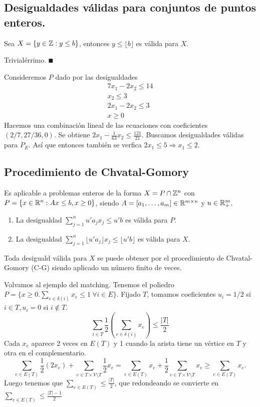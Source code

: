 \documentclass[MIOP.tex]{subfiles}
\begin{document}
\subsection{Desigualdades válidas para conjuntos de puntos enteros.}
\begin{prop}
Sea $X=\{y\in\mathbb{Z}:y\leq b\}$, entonces $y\leq\lfloor b\rfloor$ es válida para $X$.
\end{prop}
\begin{dem}
Trivialérrimo. $\QED$
\end{dem}
\begin{ej}
Consideremos $P$ dado por las desigualdades
\begin{align*}
7x_1-2x_2\leq 14\\
x_2\leq 3\\
2x_1-2x_2\leq 3\\
x\geq 0
\end{align*}
Hacemos una combinación lineal de las ecuaciones con coeficientes $(2/7,27/36, 0)$. Se obtiene $2x_1-\frac{1}{63}x_2\leq\frac{121}{21}$. Buscamos desigualdades válidas para $P_E$. Así que entonces también se verfica $2x_1\leq 5\Rightarrow x_1\leq 2$.
\end{ej}

\subsection{Procedimiento de Chvatal-Gomory}
Es aplicable a problemas enteros de la forma $X=P\cap\mathbb{Z}^n$ con $P=\{x\in\mathbb{R}^n:Ax\leq b,x\geq 0\}$, siendo $A=[a_1,\dots,a_m]\in\mathbb{R}^{m\times n}$ y $u\in\mathbb{R}^m_+$. 
\begin{enumerate}
\item La desigualdad $\sum_{j=1}^nu'a_jx_j\leq u'b$ es válida para $P$.
\item La desigualdad $\sum_{j=1}^n\lfloor u'a_j\rfloor x_j\leq \lfloor u'b\rfloor$ es válida para $X$.
\end{enumerate}
\begin{teorema}
Toda desiguald válida para $X$ se puede obtener por el procedimiento de Chvatal-Gomory (C-G) siendo aplicado un número finito de veces.
\end{teorema}
\begin{ej}
Volvamos al ejemplo del matching. Tenemos el poliedro $P=\{x\geq 0.\sum_{e\in\delta(i)}x_e\leq 1\ \forall i\in E\}$. Fijado $T$, tomamos coeficientes $u_i=1/2$ si $i\in T, u_i=0$ si $i\notin T$. 
$$\sum_{i\in T}\frac{1}{2}(\sum_{e\in\delta(i)}x_e)\leq\frac{|T|}{2}$$
Cada $x_e$ aparece 2 veces en $E(T)$ y 1 cuando la arista tiene un vértice en $T$ y otra en el complementario.
$$\sum_{e\in E(T)}\frac{1}{2}(2x_e)+\sum_{e\in T\times V\setminus T}\frac{1}{2}x_e=\sum_{e\in E(T)}x_e+\frac{1}{2}\sum_{e\in T\times V\setminus T}x_e\geq \sum_{e\in E(T)}x_e.$$
Luego tenemos que $\sum_{e\in E(T)}\leq\frac{|T|}{2}$, que redondeando se convierte en $\sum_{e\in E(T)}\leq\frac{|T|-1}{2}$ 

\end{ej}
\end{document}
